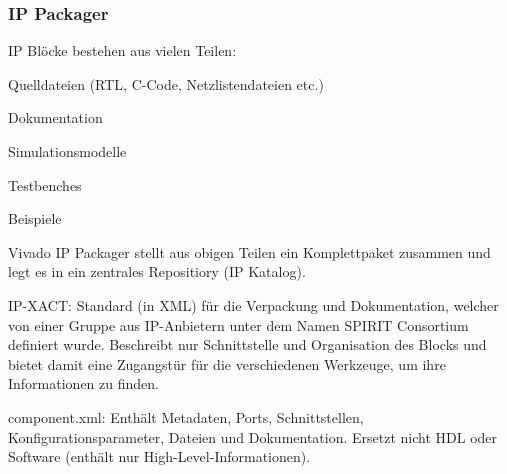 \subsubsection{IP Packager}
\begin{compactitem}
    \item IP Blöcke bestehen aus vielen Teilen:
    \begin{compactitem}
        \item Quelldateien (RTL, C-Code, Netzlistendateien etc.)
        \item Dokumentation
        \item Simulationsmodelle
        \item Testbenches
        \item Beispiele
    \end{compactitem}
    \item Vivado IP Packager stellt aus obigen Teilen ein Komplettpaket zusammen und legt es in ein zentrales Repositiory (IP Katalog).
    \item IP-XACT: Standard (in XML) für die Verpackung und Dokumentation, welcher von einer Gruppe aus IP-Anbietern unter dem Namen SPIRIT Consortium definiert wurde. Beschreibt nur Schnittstelle und Organisation des Blocks und bietet damit eine Zugangstür für die verschiedenen Werkzeuge, um ihre Informationen zu finden.
    \item component.xml: Enthält Metadaten, Ports, Schnittstellen, Konfigurationsparameter, Dateien und Dokumentation. Ersetzt nicht HDL oder Software (enthält nur High-Level-Informationen).
\end{compactitem}

